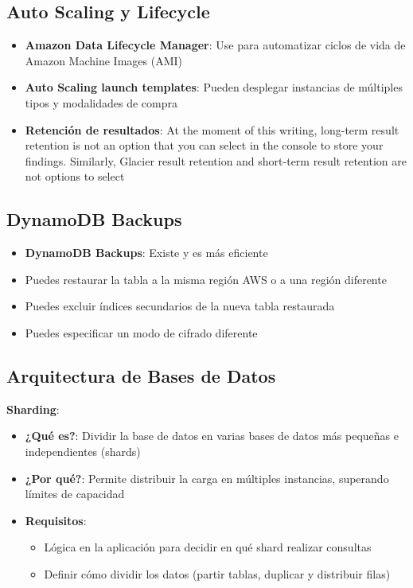 \documentclass[12pt,a4paper]{report}
\begin{document}
\subsection{Auto Scaling y Lifecycle}

\begin{itemize}
    \item \textbf{Amazon Data Lifecycle Manager}: Use para automatizar ciclos de vida de Amazon Machine Images (AMI)
    \item \textbf{Auto Scaling launch templates}: Pueden desplegar instancias de múltiples tipos y modalidades de compra
    \item \textbf{Retención de resultados}: At the moment of this writing, long-term result retention is not an option that you can select in the console to store your findings. Similarly, Glacier result retention and short-term result retention are not options to select
\end{itemize}

\subsection{DynamoDB Backups}

\begin{itemize}
    \item \textbf{DynamoDB Backups}: Existe y es más eficiente
    \item Puedes restaurar la tabla a la misma región AWS o a una región diferente
    \item Puedes excluir índices secundarios de la nueva tabla restaurada
    \item Puedes especificar un modo de cifrado diferente
\end{itemize}

\subsection{Arquitectura de Bases de Datos}

\textbf{Sharding}:
\begin{itemize}
    \item \textbf{¿Qué es?}: Dividir la base de datos en varias bases de datos más pequeñas e independientes (shards)
    \item \textbf{¿Por qué?}: Permite distribuir la carga en múltiples instancias, superando límites de capacidad
    \item \textbf{Requisitos}:
    \begin{itemize}
        \item Lógica en la aplicación para decidir en qué shard realizar consultas
        \item Definir cómo dividir los datos (partir tablas, duplicar y distribuir filas)
    \end{itemize}
\end{itemize}
\end{document}
